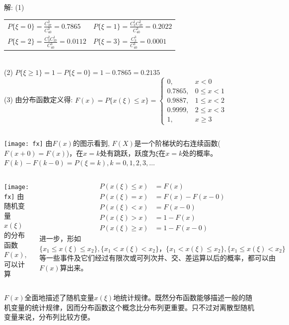\begin{frame}
\begin{block}{解:}
		(1) \begin{tabular}{ll}
			$P\{\xi=0\}=\frac{C_{37}^{3}}{C_{40}^{3}}=0.7865$ & $P\{\xi=1\}=\frac{C_{3}^{1}C_{37}^{2}}{C_{40}^{3}}=0.2022$ \\ 
			$P\{\xi=2\}=\frac{C_{3}^{2}C_{37}^{1}}{C_{40}^{3}}=0.0112$ & $P\{\xi=3\}=\frac{C_{3}^{3}}{C_{40}^{3}}=0.0001$ \\ 
		\end{tabular}\\ 
		(2) $P\{\xi\ge 1\}=1-P\{\xi=0\}=1-0.7865=0.2135$\\
		(3) 由分布函数定义得:
		$F(x)=P\{x(\xi)\le x\} =
		\begin{cases}
		0,      & x<0 \\
		0.7865, & 0\le x<1 \\
		0.9887, & 1\le x<2 \\
		0.9999, & 2\le x<3 \\
		1,      & x\ge 3
		\end{cases} $
		\begin{columns}%
			\texttt{[image: fx]}
			由$F(x)$的图示看到, $F(X)$是一个阶梯状的右连续函数($F(x+0)=F(x)$)，在$x=k$处有跳跃，跃度为$\xi$在$x=k$处的概率。\\
            $F(k)-F(k-0)=P(\xi=k), k=0,1,2,3,\dots$			
	    \end{columns}
\end{block}
\end{frame}

\begin{frame}
\begin{columns}
	\texttt{[image: fx]}
	由随机变量$x(\xi)$的分布函数$F(x)$, 可以计算
	\begin{block}{}
		\begin{align*}
		P(x(\xi)\le x) &= F(x)\\
		P(x(\xi) = x) &= F(x)-F(x-0) \\
		P(x(\xi) < x) &= F(x-0) \\
		P(x(\xi) > x) &= 1- F(x) \\
		P(x(\xi) \ge x) &= 1-F(x-0)
		\end{align*}
		进一步，形如$\{x_1\le x(\xi)\le x_2\},\{x_1< x(\xi)< x_2\}，\{x_1< x(\xi)\le x_2\}, \{x_1\le x(\xi)< x_2\}$等一些事件及它们经过有限次或可列次并、交、差运算以后的概率，都可以由$F(x)$算出来。
	\end{block}
 \end{columns}
\begin{block}{}
	$F(x)$全面地描述了随机变量$x(\xi)$地统计规律。既然分布函数能够描述一般的随机变量的统计规律，因而分布函数这个概念比分布列更重要。只不过对离散型随机变量来说，分布列比较方便。
\end{block}
\end{frame}

